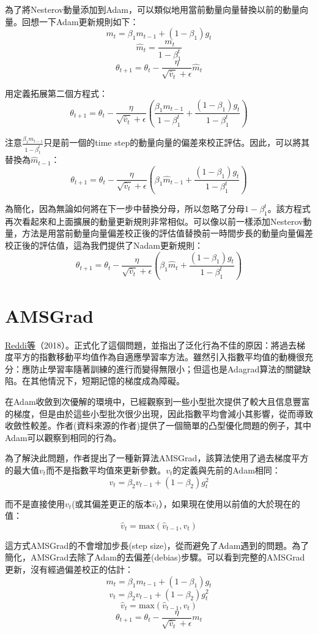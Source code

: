 \documentclass[13pt, a4paper]{report}
\begin{document}
為了將Nesterov動量添加到Adam，可以類似地用當前動量向量替換以前的動量向量。回想一下Adam更新規則如下：
$$m_t = \beta_1 m_{t-1} + (1 - \beta_1) g_t$$
$$\hat{m}_t = \frac{m_t}{1 - \beta^t_1}$$
$$\theta_{t+1} = \theta_{t} - \frac{\eta}{\sqrt{\hat{v}_t} + \epsilon} \hat{m}_t $$

用定義拓展第二個方程式：
$$\theta_{t+1} = \theta_{t} - \frac{\eta}{\sqrt{\hat{v}_t} + \epsilon} (\frac{\beta_1 m_{t-1}}{1 - \beta^t_1} + \frac{(1 - \beta_1) g_t}{1 - \beta^t_1})$$

注意$\frac{\beta_1 m_{t-1}}{1 - \beta^t_1}$只是前一個的time step的動量向量的偏差來校正評估。因此，可以將其替換為$\hat{m}_{t-1}$：
$$\theta_{t+1} = \theta_{t} - \frac{\eta}{\sqrt{\hat{v}_t} + \epsilon} (\beta_1 \hat{m}_{t-1} + \frac{(1 - \beta_1) g_t}{1 - \beta^t_1})$$

為簡化，因為無論如何將在下一步中替換分母，所以忽略了分母$1 - \beta^t_1$。該方程式再次看起來和上面擴展的動量更新規則非常相似。可以像以前一樣添加Nesterov動量，方法是用當前動量向量偏差校正後的評估值替換前一時間步長的動量向量偏差校正後的評估值，這為我們提供了Nadam更新規則：
$$\theta_{t+1} = \theta_{t} - \frac{\eta}{\sqrt{\hat{v}_t} + \epsilon} (\beta_1 \hat{m}_t + \frac{(1 - \beta_1) g_t}{1 - \beta^t_1})$$
\section{AMSGrad}
\href{https://ruder.io/optimizing-gradient-descent/index.html#fn19}{\underline{Reddi等}}（2018）。正式化了這個問題，並指出了泛化行為不佳的原因：將過去梯度平方的指數移動平均值作為自適應學習率方法。雖然引入指數平均值的動機很充分：應防止學習率隨著訓練的進行而變得無限小；但這也是Adagrad算法的關鍵缺陷。在其他情況下，短期記憶的梯度成為障礙。

在Adam收斂到次優解的環境中，已經觀察到一些小型批次提供了較大且信息豐富的梯度，但是由於這些小型批次很少出現，因此指數平均會減小其影響，從而導致收斂性較差。作者(資料來源的作者)提供了一個簡單的凸型優化問題的例子，其中Adam可以觀察到相同的行為。

為了解決此問題，作者提出了一種新算法AMSGrad，該算法使用了過去梯度平方的最大值$v_t$而不是指數平均值來更新參數。$v_t$的定義與先前的Adam相同：
$$v_t = \beta_2 v_{t-1} + (1 - \beta_2) g_t^2$$

而不是直接使用$v_t$(或其偏差更正的版本$\hat{v}_t$），如果現在使用以前值的大於現在的值：
$$\hat{v}_t = \text{max}(\hat{v}_{t-1}, v_t)$$

這方式AMSGrad的不會增加步長(step size)，從而避免了Adam遇到的問題。為了簡化，AMSGrad去除了Adam的去偏差(debias)步驟。可以看到完整的AMSGrad更新，沒有經過偏差校正的估計：
$$m_t = \beta_1 m_{t-1} + (1 - \beta_1) g_t $$ 
$$v_t = \beta_2 v_{t-1} + (1 - \beta_2) g_t^2$$ 
$$\hat{v}_t = \text{max}(\hat{v}_{t-1}, v_t)$$ 
$$\theta_{t+1} = \theta_{t} - \frac{\eta}{\sqrt{\hat{v}_t} + \epsilon} m_t$$
\end{document}
